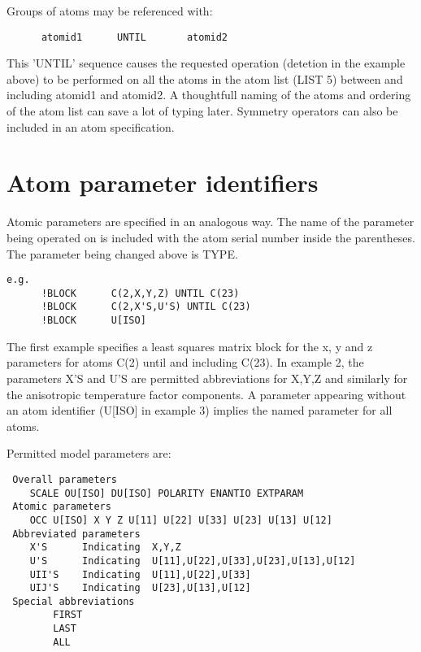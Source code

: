 \documentclass[10pt,a4paper]{report}
\begin{document}
Groups of atoms may be referenced with:

\small\begin{verbatim}
      atomid1      UNTIL       atomid2
\end{verbatim}\normalsize


 This 'UNTIL' sequence causes the requested operation (detetion in the example
 above) to be performed on all
 the atoms in the atom list (LIST 5) between and including atomid1 and atomid2.
 A thoughtfull naming of the atoms and ordering of the atom list can save
 a lot of typing later. Symmetry operators can also be included in an atom
 specification.




\section{Atom parameter identifiers}


Atomic parameters are specified in an analogous way. The name of the
 parameter being operated on is included with the atom serial number inside
 the parentheses. The parameter being changed above is TYPE.

\small\begin{verbatim}
e.g.
      !BLOCK      C(2,X,Y,Z) UNTIL C(23)
      !BLOCK      C(2,X'S,U'S) UNTIL C(23)
      !BLOCK      U[ISO]
\end{verbatim}\normalsize


 The first example specifies
 a least squares matrix block for the x, y and z parameters for
 atoms C(2) until and including C(23). In example 2, the parameters X'S
 and U'S are permitted
 abbreviations for X,Y,Z and similarly for the anisotropic temperature
 factor components. A parameter appearing without an atom identifier
 (U[ISO] in example 3) implies the named parameter for all atoms.


Permitted model parameters are:

\small\begin{verbatim}
 Overall parameters
    SCALE OU[ISO] DU[ISO] POLARITY ENANTIO EXTPARAM
 Atomic parameters
    OCC U[ISO] X Y Z U[11] U[22] U[33] U[23] U[13] U[12]
 Abbreviated parameters
    X'S      Indicating  X,Y,Z
    U'S      Indicating  U[11],U[22],U[33],U[23],U[13],U[12]
    UII'S    Indicating  U[11],U[22],U[33]
    UIJ'S    Indicating  U[23],U[13],U[12]
 Special abbreviations
        FIRST
        LAST
        ALL
\end{verbatim}\normalsize
\end{document}
